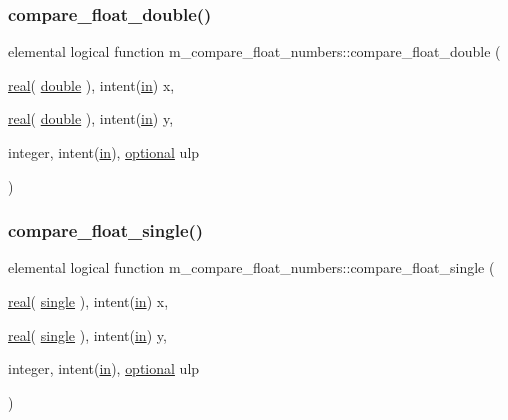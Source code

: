 \subsubsection{\texorpdfstring{compare\+\_\+float\+\_\+double()}{compare\_float\_double()}}
{\footnotesize\ttfamily elemental logical function m\+\_\+compare\+\_\+float\+\_\+numbers\+::compare\+\_\+float\+\_\+double (\begin{DoxyParamCaption}\item[{\hyperlink{read__watch_83_8txt_abdb62bde002f38ef75f810d3a905a823}{real}( \hyperlink{namespacem__compare__float__numbers_af4b789cd6e1a2abcd412eaf29e91ea0c}{double} ), intent(\hyperlink{M__journal_83_8txt_afce72651d1eed785a2132bee863b2f38}{in})}]{x,  }\item[{\hyperlink{read__watch_83_8txt_abdb62bde002f38ef75f810d3a905a823}{real}( \hyperlink{namespacem__compare__float__numbers_af4b789cd6e1a2abcd412eaf29e91ea0c}{double} ), intent(\hyperlink{M__journal_83_8txt_afce72651d1eed785a2132bee863b2f38}{in})}]{y,  }\item[{integer, intent(\hyperlink{M__journal_83_8txt_afce72651d1eed785a2132bee863b2f38}{in}), \hyperlink{option__stopwatch_83_8txt_aa4ece75e7acf58a4843f70fe18c3ade5}{optional}}]{ulp }\end{DoxyParamCaption})\hspace{0.3cm}{\ttfamily [private]}}

\mbox{\label{namespacem__compare__float__numbers_a5f413c6822015914ba48d10503f2bb0f}} 
\subsubsection{\texorpdfstring{compare\+\_\+float\+\_\+single()}{compare\_float\_single()}}
{\footnotesize\ttfamily elemental logical function m\+\_\+compare\+\_\+float\+\_\+numbers\+::compare\+\_\+float\+\_\+single (\begin{DoxyParamCaption}\item[{\hyperlink{read__watch_83_8txt_abdb62bde002f38ef75f810d3a905a823}{real}( \hyperlink{namespacem__compare__float__numbers_a5f122d46d6ad7d1cf0b899d9c855c498}{single} ), intent(\hyperlink{M__journal_83_8txt_afce72651d1eed785a2132bee863b2f38}{in})}]{x,  }\item[{\hyperlink{read__watch_83_8txt_abdb62bde002f38ef75f810d3a905a823}{real}( \hyperlink{namespacem__compare__float__numbers_a5f122d46d6ad7d1cf0b899d9c855c498}{single} ), intent(\hyperlink{M__journal_83_8txt_afce72651d1eed785a2132bee863b2f38}{in})}]{y,  }\item[{integer, intent(\hyperlink{M__journal_83_8txt_afce72651d1eed785a2132bee863b2f38}{in}), \hyperlink{option__stopwatch_83_8txt_aa4ece75e7acf58a4843f70fe18c3ade5}{optional}}]{ulp }\end{DoxyParamCaption})\hspace{0.3cm}{\ttfamily [private]}}

